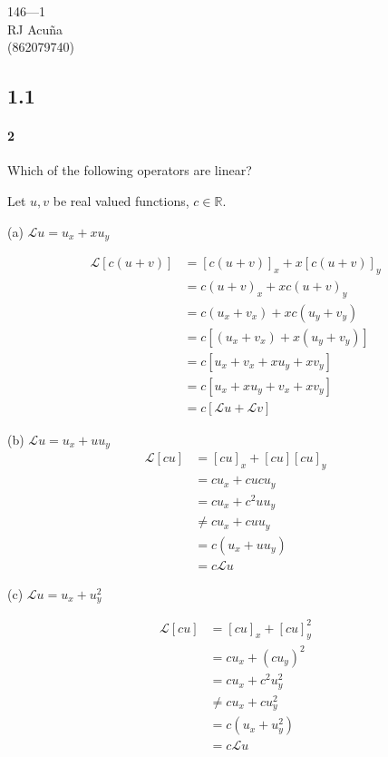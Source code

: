 \documentclass{article}
\newcommand\R{\mathbb{R}}
\newcommand\Lin{\mathcal{L}}
\begin{document}
\begin{center}
  146---1\\
  RJ Acuña\\
  (862079740)
\end{center}
\subsection*{1.1}
\paragraph{2} Which of the following operators are linear?

Let $u,v$ be real valued functions, $c\in\R.$

(a) $\Lin u = u_x + xu_y$

\begin{align*}
  \Lin [c(u+v)] &= [c(u+v)]_x + x[c(u+v)]_y\\
              &= c(u+v)_x + xc(u+v)_y\\
              &= c(u_x+v_x) + xc(u_y+v_y)\\
              &= c[(u_x+v_x) + x(u_y+v_y)]\\
              &= c[u_x+v_x + xu_y+xv_y]\\
              &= c[u_x + xu_y +v_x + xv_y]\\
  &= c[\Lin u + \Lin v]
\end{align*}

(b) $\Lin u = u_x + uu_y$
\begin{align*}
  \Lin [cu] &= [cu]_x + [cu][cu]_y\\
            &= cu_x + cucu_y\\
            &= cu_x + c^2uu_y\\
            &\neq cu_x + cuu_y\\
            &= c(u_x + uu_y)\\
            &= c\Lin u
\end{align*}

(c) $\Lin u = u_x + u_y^2$

\begin{align*}
  \Lin [cu] &= [cu]_x + [cu]_y^2\\
            &= cu_x + (cu_y)^2\\
            &= cu_x + c^2u_y^2\\
            &\neq cu_x + cu_y^2\\
            &= c(u_x + u_y^2)\\
            &= c\Lin u
\end{align*}
\end{document}
